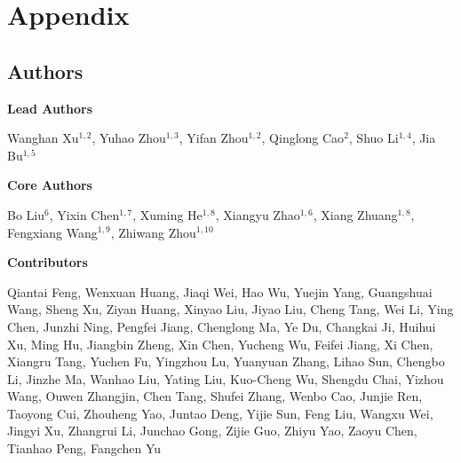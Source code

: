 \appendix

\section{Appendix}

\subsection{Authors}

\textbf{Lead Authors}

Wanghan Xu$^{1,2}$, Yuhao Zhou$^{1,3}$, Yifan Zhou$^{1,2}$, Qinglong Cao$^{2}$, Shuo Li$^{1,4}$, Jia Bu$^{1,5}$

\textbf{Core Authors}

Bo Liu$^{6}$, Yixin Chen$^{1,7}$, Xuming He$^{1,8}$, Xiangyu Zhao$^{1,6}$, Xiang Zhuang$^{1,8}$, Fengxiang Wang$^{1,9}$, Zhiwang Zhou$^{1,10}$

\textbf{Contributors}

Qiantai Feng, Wenxuan Huang, Jiaqi Wei, Hao Wu, Yuejin Yang, Guangshuai Wang, Sheng Xu,
Ziyan Huang, Xinyao Liu, Jiyao Liu, Cheng Tang, Wei Li, Ying Chen, Junzhi Ning, Pengfei Jiang, Chenglong Ma, Ye Du, Changkai Ji, Huihui Xu, Ming Hu,
Jiangbin Zheng, Xin Chen, Yucheng Wu, Feifei Jiang, 
Xi Chen, Xiangru Tang, 
Yuchen Fu, Yingzhou Lu, Yuanyuan Zhang,
Lihao Sun, Chengbo Li, Jinzhe Ma, Wanhao Liu,
Yating Liu, Kuo-Cheng Wu,
Shengdu Chai,
Yizhou Wang, Ouwen Zhangjin, Chen Tang, Shufei Zhang, Wenbo Cao, Junjie Ren, Taoyong Cui,
Zhouheng Yao, Juntao Deng, Yijie Sun, 
Feng Liu, Wangxu Wei, Jingyi Xu, Zhangrui Li, Junchao Gong, Zijie Guo, 
Zhiyu Yao, Zaoyu Chen, Tianhao Peng, 
Fangchen Yu

